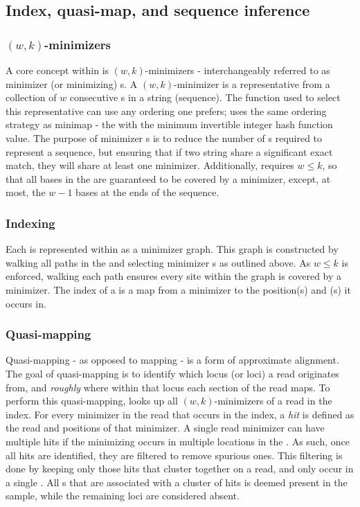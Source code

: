 \subsection{Index, quasi-map, and sequence inference}

\subsubsection{$(w,k)$-minimizers}
A core concept within \pandora{} is $(w,k)$-minimizers \cite{Roberts2004} - interchangeably referred to as minimizer (or minimizing) \kmer{}s. A $(w,k)$-minimizer is a representative \kmer{} from a collection of $w$ consecutive \kmer{}s in a string (sequence). The function used to select this representative can use any ordering one prefers; \pandora{} uses the same ordering strategy as minimap \cite{minimap2016} - the \kmer{} with the minimum invertible integer hash function value. The purpose of minimizer \kmer{}s is to reduce the number of \kmer{}s required to represent a sequence, but ensuring that if two string share a significant exact match, they will share at least one minimizer. Additionally, \pandora{} requires $w\le k$, so that all bases in the \prg{} are guaranteed to be covered by a minimizer, except, at most, the $w-1$ bases at the ends of the sequence.

\subsubsection{Indexing}
Each \prg{} is represented within \pandora{} as a minimizer \kmer{} graph. This graph is constructed by walking all paths in the \prg{} and selecting minimizer \kmer{}s as outlined above. As $w\le k$ is enforced, walking each path ensures every site within the graph is covered by a minimizer. The index of a \panrg{} is a map from a minimizer \kmer{} to the position(s) and \prg{}(s) it occurs in. 

\subsubsection{Quasi-mapping}
Quasi-mapping - as opposed to mapping - is a form of approximate alignment. The goal of quasi-mapping is to identify which locus (or loci) a read originates from, and \emph{roughly} where within that locus each section of the read maps. To perform this quasi-mapping, \pandora{} looks up all $(w,k)$-minimizers of a read in the index. For every minimizer in the read that occurs in the index, a \emph{hit} is defined as the read and \prg{} positions of that minimizer. A single read minimizer can have multiple hits if the minimizing \kmer{} occurs in multiple locations in the \panrg{}. As such, once all hits are identified, they are filtered to remove spurious ones. This filtering is done by keeping only those hits that cluster together on a read, and only occur in a single \prg{}. All \prg{}s that are associated with a cluster of hits is deemed present in the sample, while the remaining loci are considered absent.


